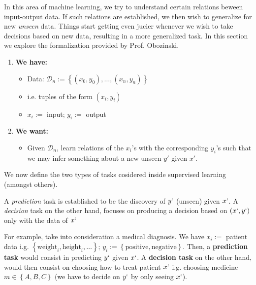In this area of machine learning, we try to understand certain relations beween input-output data. If such relations are established, we then wish to generalize for new \textit{unseen} data.
Things start getting even jucier whenever we wish to take decisions based on new data, resulting in a more generalized task. In this section we explore the formalization provided by Prof. Obozinski.

\begin{enumerate}
    \item \textbf{We have:}
    \begin{itemize}
        \item Data: $\mathcal{D}_n := \left\{ (x_0,y_0), \ldots, (x_n,y_n) \right\}$
        \item i.e. tuples of the form $(x_i, y_i)$
        \item $x_i:=$ input; $y_i:=$ output
    \end{itemize}

    \item \textbf{We want:}
    \begin{itemize}
        \item Given $\mathcal{D}_n$, learn relations of the $x_i$'s with the corresponding $y_i$'s such that we may infer something about a new unseen $y'$ given $x'$.
    \end{itemize}
\end{enumerate}

We now define the two types of tasks cosidered inside supervised learning (amongst others).

\begin{definition}
    A \textit{prediction} task is established to be the discovery of $y`$ (unseen) given $x`$. A \textit{decision} task on the
    other hand, focuses on producing a decision based on $(x`,y`)$ only with the data of $x`$
\end{definition}

For example, take into consideration a medical diagnosis. We have $x_i :=$ patient data i.g. $\left\{ \text{weight}_i, \text{height}_i, \ldots \right\}$; $y_i := \left\{ \text{positive}, \text{negative} \right\}$. Then, a \textbf{prediction task} 
would consist in predicting $y`$ given $x`$. A \textbf{decision task} on the other hand, would then consist on choosing how to treat patient $x`$ i.g. choosing medicine $m \in \left\{ A,B,C \right\}$ (we have to decide on $y`$ by only seeing $x`$).

\vspace{0.3cm}


